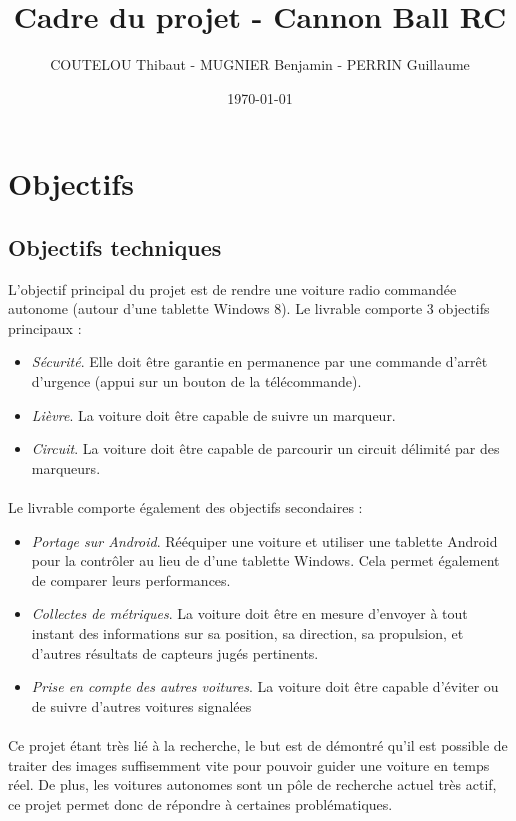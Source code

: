 \documentclass[a4paper,12pt]{article}
\title{Cadre du projet - Cannon Ball RC}
\author{COUTELOU Thibaut - MUGNIER Benjamin - PERRIN Guillaume}
\date{\today}
\begin{document}
\maketitle


\section{Objectifs}

\subsection{Objectifs techniques}

L'objectif principal du projet est de rendre une voiture radio commandée
autonome (autour d'une tablette Windows 8). Le livrable comporte 3 objectifs principaux :
\begin{itemize}
    \item \emph{Sécurité}. Elle doit être garantie en permanence par une commande d'arrêt
        d'urgence (appui sur un bouton de la télécommande).
    \item \emph{Lièvre}. La voiture doit être capable de suivre un marqueur.
    \item \emph{Circuit}. La voiture doit être capable de parcourir un circuit délimité par des
        marqueurs.
\end{itemize}

\paragraph{}
Le livrable comporte également des objectifs secondaires :
\begin{itemize}
    \item \emph{Portage sur Android}. Rééquiper une voiture et utiliser une tablette
        Android pour la contrôler au lieu de d'une tablette Windows. Cela permet
        également de comparer leurs performances.
    \item \emph{Collectes de métriques}. La voiture doit être en mesure d'envoyer à tout instant
        des informations sur sa position, sa direction, sa propulsion, et d'autres
        résultats de capteurs jugés pertinents.
    \item \emph{Prise en compte des autres voitures}. La voiture doit être
        capable d'éviter ou de suivre d'autres voitures signalées
\end{itemize}

\paragraph{}
Ce projet étant très lié à la recherche, le but est de démontré qu'il est possible de
traiter des images suffisemment vite pour pouvoir guider une voiture en temps réel. De
plus, les voitures autonomes sont un pôle de recherche actuel très actif, ce projet
permet donc de répondre à certaines problématiques.
\end{document}
